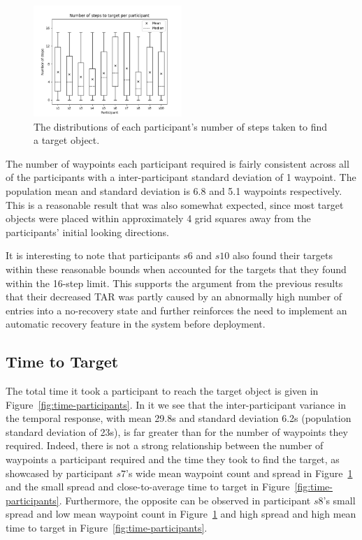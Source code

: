\documentclass[a4paper, twoside]{article}
\begin{document}
\begin{figure}
  \centering
  \includegraphics[width=0.5\textwidth]{figures/boxplot_nsteps_subjects.png}
  \caption{The distributions of each participant's number of steps taken to find a target object. }\label{fig:nsteps-participants}
\end{figure}

The number of waypoints each participant required is fairly consistent across all of the participants with a inter-participant standard deviation of 1 waypoint. The population mean and standard deviation is 6.8 and 5.1 waypoints respectively. This is a reasonable result that was also somewhat expected, since most target objects were placed within approximately 4 grid squares away from the participants' initial looking directions.

It is interesting to note that participants $s6$ and $s10$ also found their targets within these reasonable bounds when accounted for the targets that they found within the 16-step limit. This supports the argument from the previous results that their decreased TAR was partly caused by an abnormally high number of entries into a no-recovery state and further reinforces the need to implement an automatic recovery feature in the system before deployment. 

\subsection{Time to Target}

\noindent The total time it took a participant to reach the target object is given in Figure~\ref{fig:time-participants}. In it we see that the inter-participant variance in the temporal response, with mean 29.8s and standard deviation 6.2s (population standard deviation of 23s), is far greater than for the number of waypoints they required. Indeed, there is not a strong relationship between the number of waypoints a participant required and the time they took to find the target, as showcased by participant $s7$'s wide mean waypoint count and spread in Figure~\ref{fig:nsteps-participants} and the small spread and close-to-average time to target in Figure~\ref{fig:time-participants}. Furthermore, the opposite can be observed in participant $s8$'s small spread and low mean waypoint count in Figure~\ref{fig:nsteps-participants} and high spread and high mean time to target in Figure~\ref{fig:time-participants}. 
\end{document}
